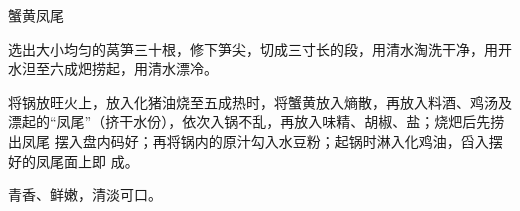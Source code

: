 \begin{recipe}{蟹黄凤尾}

\ingredients


\preparation

\step 选出大小均匀的莴笋三十根，修下笋尖，切成三寸长的段，用清水淘洗干净，用开
水泹至六成𤆵捞起，用清水漂冷。

\step 将锅放旺火上，放入化猪油烧至五成热时，将蟹黄放入熵散，再放入料酒、鸡汤及
漂起的“凤尾”（挤干水份），依次入锅不乱，再放入味精、胡椒、盐；烧𤆵后先捞出凤尾
摆入盘内码好；再将锅内的原汁勾入水豆粉；起锅时淋入化鸡油，舀入摆好的凤尾面上即
成。

\features

青香、鲜嫩，清淡可口。

\end{recipe}

